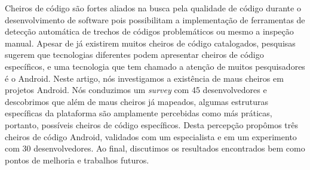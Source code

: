 Cheiros de c\'odigo s\~ao fortes aliados na busca pela qualidade de c\'odigo durante o desenvolvimento de software pois possibilitam a implementa\c{c}\~ao de ferramentas de detec\c{c}\~ao autom\'atica de trechos de c\'odigos problem\'aticos ou mesmo a inspe\c{c}\~ao manual. Apesar de j\'a existirem muitos cheiros de c\'odigo catalogados, pesquisas sugerem que tecnologias diferentes podem apresentar cheiros de c\'odigo espec\'ificos, e uma tecnologia que tem chamado a aten\c{c}\~ao de muitos pesquisadores \'e o Android. Neste artigo, n\'os investigamos a exist\^encia de maus cheiros em projetos Android. N\'os conduzimos um \textit{survey} com 45 desenvolvedores e descobrimos que al\'em de maus cheiros j\'a mapeados, algumas estruturas espec\'ificas da plataforma s\~ao amplamente percebidas como m\'as pr\'aticas, portanto, poss\'iveis cheiros de c\'odigo espec\'ificos. Desta percep\c{c}\~ao prop\^omos tr\^es cheiros de c\'odigo Android, validados com um especialista e em um experimento com 30 desenvolvedores. Ao final, discutimos os resultados encontrados bem como pontos de melhoria e trabalhos futuros.